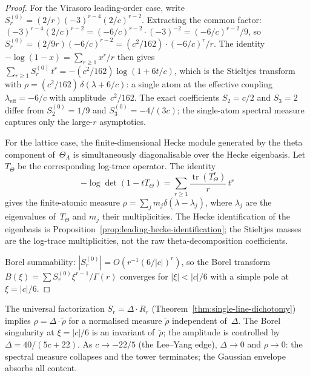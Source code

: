 \begin{proof}
For the Virasoro leading-order case, write
$S_r^{(0)} = (2/r)(-3)^{r-4}(2/c)^{r-2}$.
Extracting the common factor:
$(-3)^{r-4}(2/c)^{r-2} = (-6/c)^{r-2}\cdot(-3)^{-2}
= (-6/c)^{r-2}/9$, so
$S_r^{(0)} = (2/9r)(-6/c)^{r-2}
= (c^2/162)\cdot(-6/c)^r/r$.
The identity $-\log(1-x) = \sum_{r\ge1} x^r/r$ then gives
$\sum_{r\ge1} S_r^{(0)}\,t^r
= -(c^2/162)\log(1+6t/c)$,
which is the Stieltjes transform with
$\rho = (c^2/162)\,\delta(\lambda + 6/c)$:
a single atom at the effective
coupling~$\lambda_{\mathrm{eff}} = -6/c$
with amplitude~$c^2/162$. The exact coefficients
$S_2 = c/2$ and $S_3 = 2$ differ from
$S_2^{(0)} = 1/9$ and $S_3^{(0)} = -4/(3c)$;
the single-atom spectral measure
captures only the large-$r$ asymptotics.

For the lattice case, the finite-dimensional Hecke module generated by
the theta component of~$\Theta_\Lambda$ is simultaneously diagonalisable
over the Hecke eigenbasis. Let $T_\Theta$ be the corresponding
log-trace operator. The identity
\[
 -\log\det(1-tT_\Theta)
 =
 \sum_{r\ge1}\frac{\operatorname{tr}(T_\Theta^r)}{r}\,t^r
\]
gives the finite-atomic measure
$\rho=\sum_j m_j\delta(\lambda-\lambda_j)$, where $\lambda_j$ are the
eigenvalues of~$T_\Theta$ and $m_j$ their multiplicities. The Hecke
identification of the eigenbasis is Proposition~\ref{prop:leading-hecke-identification};
the Stieltjes masses are the log-trace multiplicities, not the raw
theta-decomposition coefficients.

Borel summability: $|S_r^{(0)}| = O(r^{-1}(6/|c|)^r)$, so
the Borel transform
$B(\xi) = \sum S_r^{(0)}\xi^{r-1}/\Gamma(r)$ converges for
$|\xi| < |c|/6$ with a simple pole at $\xi = |c|/6$.
\end{proof}

\begin{remark}
\label{rem:stieltjes-discriminant}
The universal factorization $S_r = \Delta \cdot R_r$
(Theorem~\ref{thm:single-line-dichotomy}) implies
$\rho = \Delta \cdot \tilde\rho$ for a normalised measure
$\tilde\rho$ independent of~$\Delta$. The
Borel singularity at $\xi = |c|/6$ is an invariant
of~$\tilde\rho$; the amplitude is controlled
by~$\Delta = 40/(5c{+}22)$.
As $c \to -22/5$ (the Lee--Yang edge),
$\Delta \to 0$ and $\rho \to 0$:
the spectral measure collapses and the tower
terminates; the Gaussian envelope absorbs all content.
\end{remark}

